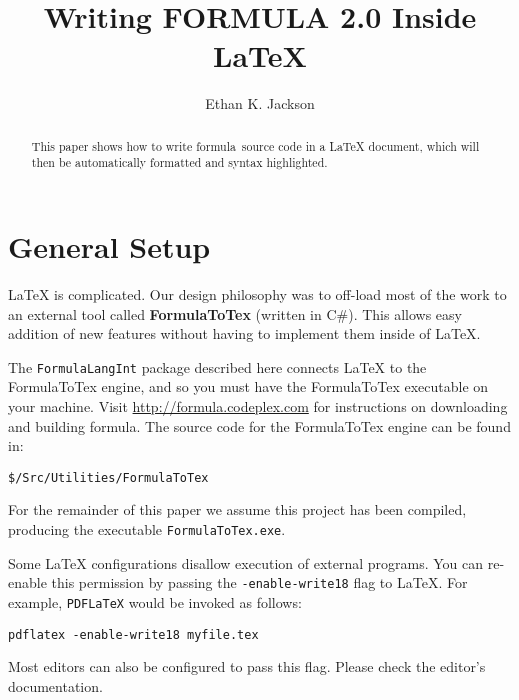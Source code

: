 \documentclass{llncs}
\newcommand{\frm}{{\sc formula}}
\begin{document}
\title{Writing FORMULA 2.0 Inside LaTeX}
\author{Ethan K. Jackson}

\maketitle

\begin{abstract}
This paper shows how to write \frm~source code in a LaTeX document, which will then be automatically formatted and syntax highlighted.
\end{abstract}

\section{General Setup}
LaTeX is complicated. Our design philosophy was to off-load most of the work to an external tool called \textbf{FormulaToTex} (written in C\#). This allows easy addition of new features without having to implement them inside of LaTeX. 

The \texttt{FormulaLangInt} package described here connects LaTeX to the FormulaToTex engine, and so you must have the FormulaToTex executable on your machine. Visit \url{http://formula.codeplex.com} for instructions on downloading and building \frm. The source code for the FormulaToTex engine can be found in: 
\begin{verbatim}
$/Src/Utilities/FormulaToTex
\end{verbatim}
For the remainder of this paper we assume this project has been compiled, producing the executable \texttt{FormulaToTex.exe}.

Some LaTeX configurations disallow execution of external programs. You can re-enable this permission by passing the \texttt{-enable-write18} flag to LaTeX. For example, \texttt{PDFLaTeX} would be invoked as follows:
\begin{verbatim}
pdflatex -enable-write18 myfile.tex
\end{verbatim} 
Most editors can also be configured to pass this flag. Please check the editor's documentation.
\end{document}
